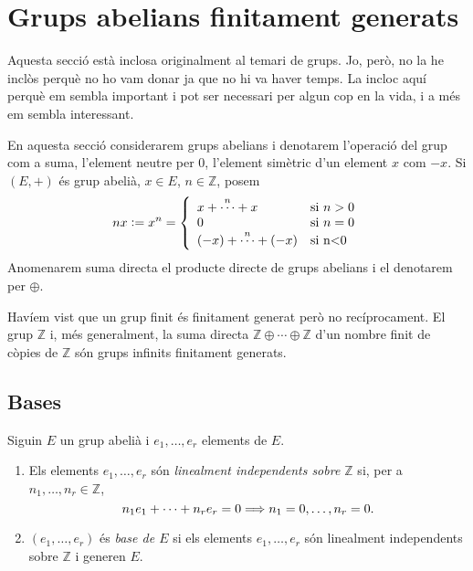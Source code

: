 \documentclass[../main.tex]{subfiles}
\begin{document}
\chapter{Grups abelians finitament generats}



















Aquesta secció està inclosa originalment al temari de grups. Jo, però, no la he inclòs perquè no ho vam donar ja que no hi va haver temps. La incloc aquí perquè em sembla important i pot ser necessari per algun cop en la vida, i a més em sembla interessant.

En aquesta secció considerarem grups abelians i denotarem l'operació del grup com a suma, l'element neutre per 0, l'element simètric d'un element $x$ com $-x$. Si $(E,+)$ és grup abelià, $x\in E$, $n\in\mathbb{Z}$, posem 
\begin{equation}
    \notag
    nx := x^n = \left\{
    \begin{array}{ll}
        x+\overset{n}{\cdots}+x & \text{si $n>0$}\\
        0 & \text{si $n = 0$} \\
        (-x)+\overset{n}{\cdots}+(-x) & \text{si n<0}
    \end{array}
    \right.
\end{equation}
Anomenarem suma directa el producte directe de grups abelians i el denotarem per $\oplus$.

Havíem vist que un grup finit és finitament generat però no recíprocament. El grup $\mathbb{Z}$ i, més generalment, la suma directa $\mathbb{Z}\oplus\cdots\oplus\mathbb{Z}$ d'un nombre finit de còpies de $\mathbb{Z}$ són grups infinits finitament generats.



\section{Bases}
\begin{defi}
Siguin $E$ un grup abelià i $e_1,\ldots,e_r$ elements de $E$.
\begin{enumerate}[1)]
    \item Els elements $e_1,\ldots,e_r$ són \textit{linealment independents sobre $\mathbb{Z}$} si, per a $n_1,\ldots,n_r\in\mathbb{Z}$,
    \begin{equation}
        \notag
        n_1e_1+\cdots+n_re_r = 0 \Longrightarrow n_1 = 0,\ldots, n_r = 0.
    \end{equation}
    \item $(e_1,\ldots,e_r)$ és \textit{base de $E$} si els elements $e_1,\ldots,e_r$ són linealment independents sobre $\mathbb{Z}$ i generen $E$.
\end{enumerate}
\end{defi}
\end{document}
